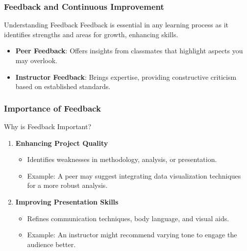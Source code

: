 \documentclass[aspectratio=169]{beamer}
\begin{document}
\begin{frame}[fragile]
    \frametitle{Feedback and Continuous Improvement}
    \begin{block}{Understanding Feedback}
        Feedback is essential in any learning process as it identifies strengths and areas for growth, enhancing skills.
        \begin{itemize}
            \item \textbf{Peer Feedback}: Offers insights from classmates that highlight aspects you may overlook.
            \item \textbf{Instructor Feedback}: Brings expertise, providing constructive criticism based on established standards.
        \end{itemize}
    \end{block}
\end{frame}

\begin{frame}[fragile]
    \frametitle{Importance of Feedback}
    \begin{block}{Why is Feedback Important?}
        \begin{enumerate}
            \item \textbf{Enhancing Project Quality}
                \begin{itemize}
                    \item Identifies weaknesses in methodology, analysis, or presentation.
                    \item Example: A peer may suggest integrating data visualization techniques for a more robust analysis.
                \end{itemize}
            \item \textbf{Improving Presentation Skills}
                \begin{itemize}
                    \item Refines communication techniques, body language, and visual aids.
                    \item Example: An instructor might recommend varying tone to engage the audience better.
                \end{itemize}
        \end{enumerate}
    \end{block}
\end{frame}
\end{document}
